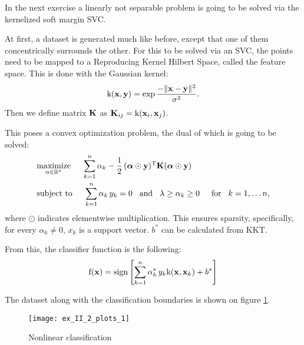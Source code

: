 In the next exercise a linearly not separable problem is going to be solved
via the kernelized soft margin SVC.

At first, a dataset is generated much like before, except that one of them concentrically
surrounds the other. For this to be solved via an SVC, the points need to be mapped
to a Reproducing Kernel Hilbert Space, called the feature space.
This is done with the Gaussian kernel:
\begin{equation}
	\mathrm{k}(\boldsymbol{\mathrm{x}}, \boldsymbol{\mathrm{y}}) = \exp\frac{-\lVert\boldsymbol{\mathrm{x}}-\boldsymbol{\mathrm{y}}\rVert^2}{\sigma^2}.
\end{equation}
Then we define matrix $\boldsymbol{\mathrm{K}}$ as $\boldsymbol{\mathrm{K}}_{ij} = \mathrm{k}(\boldsymbol{\mathrm{x}}_i, \boldsymbol{\mathrm{x}}_j)$.

This poses a convex optimization problem, the dual of which is going to be solved:
\begin{equation}
\begin{split}
	&\underset{\alpha\in\mathbb{R}^n}{\operatorname{maximize}}\hspace{5mm}
		\sum\limits_{k=1}^n\alpha_k - \frac{1}{2}\,(\boldsymbol{\mathrm{\alpha}}\odot\boldsymbol{\mathrm{y}})\textsuperscript{T}\boldsymbol{\mathrm{K}}(\boldsymbol{\mathrm{\alpha}}\odot\boldsymbol{\mathrm{y}})\\
	&\text{subject to}\hspace{5mm}
		\sum\limits_{k=1}^n\alpha_k\,y_k=0\hspace{3mm}\text{and}\hspace{3mm}\lambda\geq\alpha_k\geq0\hspace{5mm}\text{for}\hspace{3mm} k=1,\dots n,
\end{split}
\end{equation}
where $\odot$ indicates elementwise multiplication.
This ensures sparsity, specifically, for every $\alpha_k\neq0$, $x_k$ is a support vector.
$b^*$ can be calculated from KKT.

From this, the classifier function is the following:
\begin{equation}
	\mathrm{f}(\boldsymbol{\mathrm{x}}) = \operatorname{sign}\left[\sum\limits_{k=1}^n\alpha_k^*\,y_k\mathrm{k}(\boldsymbol{\mathrm{x}}, \boldsymbol{\mathrm{x}}_k) + b^*\right]
\end{equation}

The dataset along with the classification boundaries is shown on figure \ref{fig:kernel-SVC}.

\begin{figure}[H]
	\centering
	\texttt{[image: ex\_II\_2\_plots\_1]}
	\caption{Nonlinear classification}
	\label{fig:kernel-SVC}
\end{figure}

